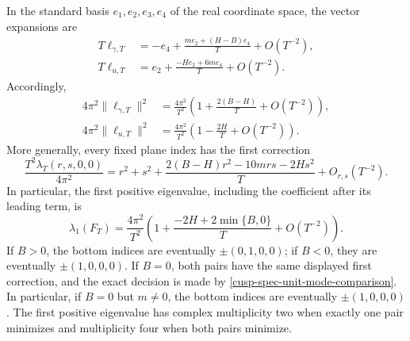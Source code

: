 \begin{theorem}
In the standard basis \(e_1,e_2,e_3,e_4\) of the real coordinate space,
the vector expansions are
\begin{align}
 T\ell_{\gamma,T}
 &=-e_4+\frac{m e_2+(H-B)e_4}{T}+O(T^{-2}),
 \label{cusp-spec-gamma-vector-correction}\\
 T\ell_{u,T}
 &=e_2+\frac{-He_2+6me_4}{T}+O(T^{-2}).
 \label{cusp-spec-u-vector-correction}
\end{align}
Accordingly,
\begin{align}
 4\pi^2\lVert\ell_{\gamma,T}\rVert^2
 &=\frac{4\pi^2}{T^2}
   \left(1+\frac{2(B-H)}{T}+O(T^{-2})\right),
 \label{cusp-spec-gamma-eigenvalue-correction}\\
 4\pi^2\lVert\ell_{u,T}\rVert^2
 &=\frac{4\pi^2}{T^2}
   \left(1-\frac{2H}{T}+O(T^{-2})\right).
 \label{cusp-spec-u-eigenvalue-correction}
\end{align}
More generally, every fixed plane index has the first correction
\begin{equation}
 \frac{T^2\lambda_T(r,s,0,0)}{4\pi^2}
 =r^2+s^2+
 \frac{2(B-H)r^2-10mrs-2Hs^2}{T}+O_{r,s}(T^{-2}).
 \label{cusp-spec-general-plane-mode-correction}
\end{equation}
In particular, the first positive eigenvalue, including the coefficient after
its leading term, is
\begin{equation}
 \boxed{
 \lambda_1(F_T)
 =\frac{4\pi^2}{T^2}
  \left(1+
   \frac{-2H+2\min\{B,0\}}{T}+O(T^{-2})\right).}
 \label{cusp-spec-first-eigenvalue-correction}
\end{equation}
If \(B>0\), the bottom indices are eventually
\(\pm(0,1,0,0)\); if \(B<0\), they are eventually
\(\pm(1,0,0,0)\).  If \(B=0\), both pairs have the same displayed
first correction, and the exact decision is made by
\cref{cusp-spec-unit-mode-comparison}.  In particular, if \(B=0\) but
\(m\ne0\), the bottom indices are eventually \(\pm(1,0,0,0)\).
The first positive eigenvalue has complex multiplicity two when exactly one
pair minimizes and multiplicity four when both pairs minimize.
\end{theorem}

